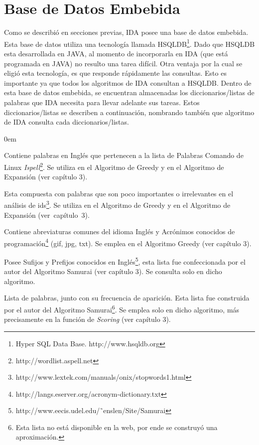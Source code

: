 \section{Base de Datos Embebida}
\label{sec:bseEmb}

Como se describió en secciones previas, IDA posee una base de datos embebida. Esta base de datos utiliza una tecnología llamada HSQLDB\footnote[1]{Hyper SQL Data Base. http://www.hsqldb.org}. Dado que HSQLDB esta desarrollada en JAVA, al momento de incorporarla en IDA (que está programada en JAVA) no resulto una tarea difícil.
Otra ventaja por la cual se eligió esta tecnología, es que responde rápidamente las consultas. Esto es importante ya que todos los algoritmos de IDA consultan a HSQLDB. Dentro de esta base de datos embebida, se encuentran almacenadas los diccionarios/listas de palabras que IDA necesita para llevar adelante sus tareas. Estos diccionarios/listas se describen a continuación, nombrando también que algoritmo de IDA consulta cada diccionarios/listas.

\begin{description}
\itemsep0em%

\item[Diccionario en Inglés (ispell):] Contiene palabras en Inglés que pertenecen a la lista de Palabras Comando de Linux \textit{Ispell}\footnote[2]{ http://wordlist.aspell.net}. Se utiliza en el Algoritmo de Greedy y en el Algoritmo de Expansión (ver capítulo 3).

\item[Lista de Palabras Excluyentes (stop-list):] Esta compuesta con palabras que son poco importantes o irrelevantes en el análisis de ids\footnote[3]{ http://www.lextek.com/manuals/onix/stopwords1.html}. Se utiliza en el Algoritmo de Greedy y en el Algoritmo de Expansión \mbox{(ver capítulo 3)}.

\item[Lista de Abreviaturas y Acrónimos Conocidas:] Contiene abreviaturas comunes del idioma Inglés y Acrónimos conocidos de programación\footnote[4]{http://langs.eserver.org/acronym-dictionary.txt} (gif, jpg, txt). Se emplea en el Algoritmo Greedy (ver capítulo 3).
\pagebreak
\item[Lista de Prefijos y Sufijos Conocidos:] Posee Sufijos y Prefijos conocidos en Inglés\footnote[1]{http://www.eecis.udel.edu/˜enslen/Site/Samurai}, esta lista fue confeccionada por el autor del Algoritmo Samurai (ver capítulo 3). Se consulta solo en dicho algoritmo.

\item[Frecuencias Globales de Palabras:] Lista de palabras, junto con su frecuencia de aparición. Esta lista fue construida por el autor del Algoritmo Samurai\footnote[2]{Esta lista no está disponible en la web, por ende se construyó una aproximación.}. Se emplea solo en dicho algoritmo, más precisamente en la función de \textit{Scoring} (ver capítulo 3).

\end{description}

